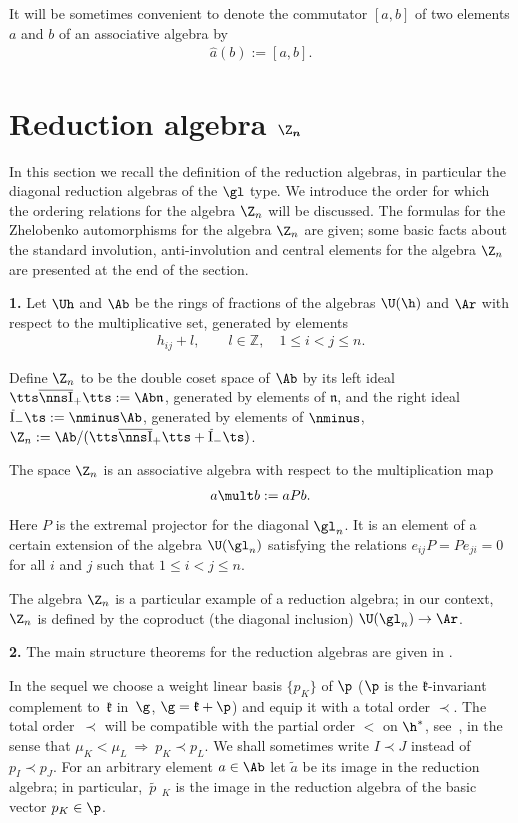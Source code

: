 \documentclass[11pt]{article}
\def\Ib{\tts\overline{\nns\rm I}_+\tts}\def\J{\mathrm{J}}\def\Jb{\,\overline{\!\rm I}_-\ts}\def\k{\mathfrak{k}}
\def\nplus{\mathfrak{n}}\def\nn{\nonumber}\def\nin{\noindent}
\def\pp{\widetilde{\phantom{\,}p\phantom{\,}\phantom{\ }}\phantom{\!}\phantom{\!}\phantom{\!}}
\newcommand{\ZZ}{{\mathbb Z}}\def\Hom{\operatorname{Hom}}\def\I{\mathrm{I}}
\numberwithin{equation}{section}
\begin{document}
It will be sometimes convenient to denote the commutator $[a,b]$ of two elements $a$ and $b$ of an associative algebra by
\begin{gather}
 \hat{a}(b):=[a,b] .\label{dehaco}
\end{gather}


\section[Reduction algebra $\Z_n$]{Reduction algebra $\boldsymbol{\Z_n}$}\label{section2}

In this section we recall the def\/inition of the reduction algebras, in particular the diagonal reduction algebras of the $\gl$ type.
We introduce the order for which
the ordering relations for the algebra $\Z_n$ will be discussed.
The formulas for the Zhelobenko automorphisms for the algebra $\Z_n$ are given; some basic facts about the standard involution, anti-involution
and central elements for the algebra $\Z_n$ are presented at the end of the section.

{\bf 1.} Let $\Uh$ and $\Ab$ be the rings of fractions of the algebras $\U(\h)$ and $\Ar$ with respect to the multiplicative set, generated by elements
\begin{gather*}
 h_{ij}+l ,\qquad l\in\ZZ  , \quad 1\leq i<j\leq n  .%
 \end{gather*}


Def\/ine $\Z_n$ to be the double coset space of $\Ab$ by its left ideal $\Ib:=\Ab\nplus$, generated by elements of $\nplus$, and the right ideal
$\Jb:=\nminus\Ab$, generated by elements of $\nminus$, $\Z_n:=\Ab/(\Ib+\Jb)$.


The space $\Z_n$ is an associative algebra with respect to the multiplication map
\begin{gather}
\label{not5a}
a\mult b:=aP b  .
\end{gather}
Here $P$ is the extremal projector \cite{AST} for the diagonal $\gl_n$.
It is an element of a certain extension of the algebra $\U(\gl_n)$ satisfying the relations $e_{ij}P=Pe_{ji}=0$ for all $i$ and
$j$ such that $1\leq i<j\leq n$.


The algebra  $\Z_n$ is a particular example of a reduction algebra; in our context, $\Z_n$ is
def\/ined by the coproduct (the diagonal inclusion) $\U(\gl_n)\to\Ar$.

{\bf 2.}  The main structure theorems for the reduction algebras are given in \cite[Section~2]{KO3}.


In the sequel we choose a weight linear basis $\{p_K\}$ of $\p$ ($\p$ is the $\k$-invariant complement to~$\k$ in~$\g$,
$\g =\k +\p$) and equip it with a total order $\prec$. The total order~$\prec$ will be compatible with the partial order $<$ on
$\h^*$, see~, in the sense that $\mu_K<\mu_L\ \Rightarrow \ p_K\prec p_L$. We shall sometimes write
$I\prec J$ instead of $p_I\prec p_J$. For an arbitrary element $a\in\Ab$ let $\widetilde{a}$ be its image in the reduction
algebra; in particular, $\pp_K$ is the image in the reduction algebra of the basic vector $p_K\in\p$.
\end{document}
